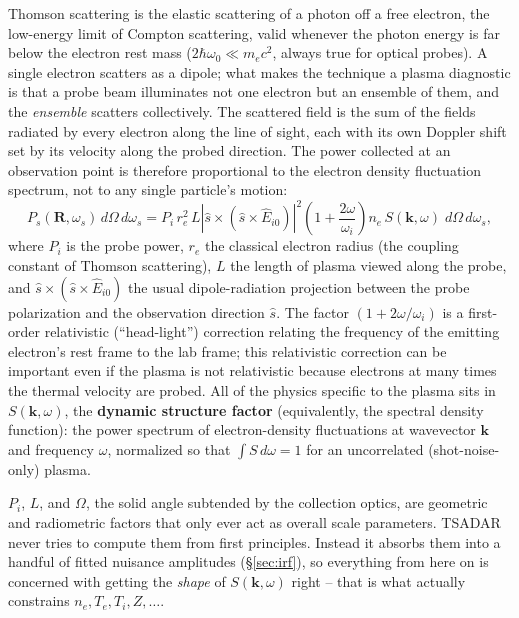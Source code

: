 \documentclass[11pt]{article}
\begin{document}
Thomson scattering is the elastic scattering of a photon off a free electron, the
low-energy limit of Compton scattering, valid whenever the photon energy is far below the
electron rest mass ($2\hbar\omega_0 \ll m_ec^2$, always true for optical probes). A single
electron scatters as a dipole; what makes the technique a plasma diagnostic
is that a probe beam illuminates not one electron but an ensemble of them, and the
\emph{ensemble} scatters collectively. The scattered field is the sum of the fields radiated
by every electron along the line of sight, each with its own Doppler shift set by its
velocity along the probed direction. The power collected at an observation point is
therefore proportional to the electron density fluctuation spectrum, not to any single
particle's motion:
\begin{equation}\label{eq:Ps}
  P_s(\mathbf R,\omega_s)\,d\Omega\,d\omega_s =
  P_i\,r_e^2\,L \left\vert \hat s\times(\hat s\times\hat E_{i0})\right\vert^2
  \left(1+\frac{2\omega}{\omega_i}\right) n_e\, S(\mathbf k,\omega)\; d\Omega\, d\omega_s,
\end{equation}
where $P_i$ is the probe power, $r_e$ the classical electron radius (the coupling constant
of Thomson scattering), $L$ the length of plasma viewed along the probe, and $\hat s\times
(\hat s\times\hat E_{i0})$ the usual dipole-radiation projection between the probe
polarization and the observation direction $\hat s$. The factor $(1+2\omega/\omega_i)$ is a
first-order relativistic (``head-light'') correction relating the frequency of the emitting
electron's rest frame to the lab frame; this relativistic correction can be important even if the plasma is not relativistic because electrons at many times the thermal velocity are probed. All of the physics specific to the plasma sits in $S(\mathbf k,\omega)$, the \textbf{dynamic
structure factor} (equivalently, the spectral density function): the power spectrum of
electron-density fluctuations at wavevector $\mathbf k$ and frequency $\omega$, normalized
so that $\int S\,d\omega = 1$ for an uncorrelated (shot-noise-only) plasma.

$P_i$, $L$, and $\Omega$, the solid angle subtended by the collection optics, are geometric and
radiometric factors that only ever act as overall scale parameters. TSADAR never tries to compute them from first principles. Instead it absorbs them into a handful of fitted nuisance amplitudes (\S\ref{sec:irf}), so everything
from here on is concerned with getting the \emph{shape} of $S(\mathbf k,\omega)$ right --
that is what actually constrains $n_e,T_e,T_i,Z,\ldots$.
\end{document}
